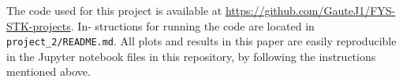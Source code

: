 The code used for this project is available at
\url{https://github.com/GauteJ1/FYS-STK-projects}. In-
structions for running the code are located in
\texttt{project\_2/README.md}. All plots and results in this paper
are easily reproducible in the Jupyter notebook files in
this repository, by following the instructions mentioned
above.
